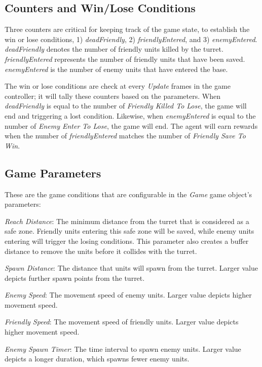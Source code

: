 \documentclass[conference]{IEEEtran}
\begin{document}
\subsection{Counters and Win/Lose Conditions}

Three counters are critical for keeping track of the game state, to establish the win or lose conditions, 1) \textit{deadFriendly}, 2) \textit{friendlyEntered}, and 3) \textit{enemyEntered}. \textit{deadFriendly} denotes the number of friendly units killed by the turret. \textit{friendlyEntered} represents the number of friendly units that have been saved. \textit{enemyEntered} is the number of enemy units that have entered the base.

The win or lose conditions are check at every \textit{Update} frames in the game controller; it will tally these counters based on the parameters. When  \textit{deadFriendly} is equal to the number of \textit{Friendly Killed To Lose}, the game will end and triggering a lost condition. Likewise, when \textit{enemyEntered} is equal to the number of \textit{Enemy Enter To Lose}, the game will end. The agent will earn rewards when the number of \textit{friendlyEntered} matches the number of \textit{Friendly Save To Win}.

\subsection{Game Parameters}

These are the game conditions that are configurable in the \textit{Game} game object's parameters:

\textit{Reach Distance}: The minimum distance from the turret that is considered as a safe zone. Friendly units entering this safe zone will be saved, while enemy units entering will trigger the losing conditions. This parameter also creates a buffer distance to remove the units before it collides with the turret.

\textit{Spawn Distance}: The distance that units will spawn from the turret. Larger value depicts further spawn points from the turret.

\textit{Enemy Speed}: The movement speed of enemy units. Larger value depicts higher movement speed.

\textit{Friendly Speed}: The movement speed of friendly units. Larger value depicts higher movement speed.

\textit{Enemy Spawn Timer}: The time interval to spawn enemy units. Larger value depicts a longer duration, which spawns fewer enemy units.
\end{document}
